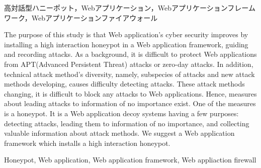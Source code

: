 \documentclass{css}
\begin{document}

\begin{jkeyword}
高対話型ハニーポット，Webアプリケーション，Webアプリケーションフレームワーク，Webアプリケーションファイアウォール
\end{jkeyword}

\begin{eabstract}
The purpose of this study is that Web application's cyber security improves by installing a high interaction honeypot in a Web application framework, guiding and recording attacks. As a background, it is difficult to protect Web applications from APT(Advanced Persistent Threat) attacks or zero-day attacks. In addition, technical attack method's diversity, namely, subspecies of attacks and new attack methods developing, causes difficulty detecting attacks. These attack methods changing, it is difficult to block any attacks to Web applications. Hence, measures about leading attacks to information of no importance exist. One of the measures is a honeypot. It is a Web application decoy systems having a few purposes: detecting attacks, leading them to information of no importance, and collecting valuable information about attack methods. We suggest a Web application framework which installs a high interaction honeypot.
\end{eabstract}


\begin{ekeyword}
Honeypot, Web application, Web application framework, Web appliaction firewall
\end{ekeyword}


\maketitle
\end{document}
